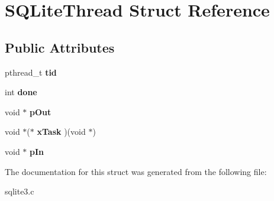 \hypertarget{structSQLiteThread}{}\section{S\+Q\+Lite\+Thread Struct Reference}
\label{structSQLiteThread}
\subsection*{Public Attributes}
\begin{DoxyCompactItemize}
\item 
pthread\+\_\+t {\bfseries tid}\hypertarget{structSQLiteThread_a344b7b30ad7f54c6cbfb4d2378982610}{}\label{structSQLiteThread_a344b7b30ad7f54c6cbfb4d2378982610}

\item 
int {\bfseries done}\hypertarget{structSQLiteThread_af13ecbf8ad23f24a5074277cdcf0383b}{}\label{structSQLiteThread_af13ecbf8ad23f24a5074277cdcf0383b}

\item 
void $\ast$ {\bfseries p\+Out}\hypertarget{structSQLiteThread_aca6d94405a6e7eefb230cd08bf1ce71b}{}\label{structSQLiteThread_aca6d94405a6e7eefb230cd08bf1ce71b}

\item 
void $\ast$($\ast$ {\bfseries x\+Task} )(void $\ast$)\hypertarget{structSQLiteThread_aadc8f1c225e769d42d981ae2e701d018}{}\label{structSQLiteThread_aadc8f1c225e769d42d981ae2e701d018}

\item 
void $\ast$ {\bfseries p\+In}\hypertarget{structSQLiteThread_ad14ce51f32c66b80c515ec2338f6ccd2}{}\label{structSQLiteThread_ad14ce51f32c66b80c515ec2338f6ccd2}

\end{DoxyCompactItemize}


The documentation for this struct was generated from the following file\+:\begin{DoxyCompactItemize}
\item 
sqlite3.\+c\end{DoxyCompactItemize}
